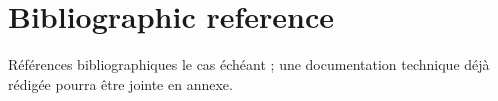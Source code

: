 
\section{Bibliographic reference}

Références bibliographiques le cas échéant ; une documentation technique déjà rédigée pourra être jointe en annexe.




